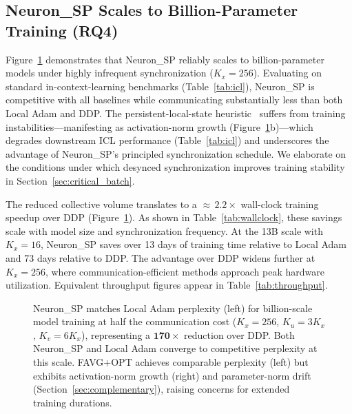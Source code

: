 \documentclass{article}
\begin{document}
\subsection{Neuron\_SP Scales to Billion-Parameter Training (RQ4)}
\label{sec:rq4}

Figure~\ref{fig:billion} demonstrates that Neuron\_SP reliably scales to
billion-parameter models under highly infrequent synchronization
($K_x = 256$). Evaluating on standard in-context-learning benchmarks
(Table~\ref{tab:icl}), Neuron\_SP is competitive with all baselines while
communicating substantially less than both Local Adam and DDP. The
persistent-local-state heuristic~\citep{sani2025photon} suffers from
training instabilities---manifesting as activation-norm growth
(Figure~\ref{fig:billion}b)---which degrades downstream ICL performance
(Table~\ref{tab:icl}) and underscores the advantage of Neuron\_SP's
principled synchronization schedule. We elaborate on the conditions under
which desynced synchronization improves training stability in
Section~\ref{sec:critical_batch}.

The reduced collective volume translates to a ${\approx}\,2.2\times$
wall-clock training speedup over DDP (Figure~\ref{fig:billion}). As
shown in Table~\ref{tab:wallclock}, these savings scale with model size
and synchronization frequency. At the 13B scale with $K_x = 16$,
Neuron\_SP saves over 13 days of training time relative to Local Adam
and 73 days relative to DDP. The advantage over DDP widens further at
$K_x = 256$, where communication-efficient methods approach peak hardware
utilization. Equivalent throughput figures appear in
Table~\ref{tab:throughput}.

\begin{figure}[t]
\centering
\caption{Neuron\_SP matches Local Adam perplexity (left) for
billion-scale model training at half the communication cost
($K_x = 256$, $K_u = 3K_x$, $K_v = 6K_x$), representing a
$\mathbf{170\times}$ reduction over DDP. Both Neuron\_SP and Local Adam
converge to competitive perplexity at this scale. FAVG+OPT achieves
comparable perplexity (left) but exhibits activation-norm growth (right)
and parameter-norm drift (Section~\ref{sec:complementary}), raising
concerns for extended training durations.}
\label{fig:billion}
\end{figure}
\end{document}
